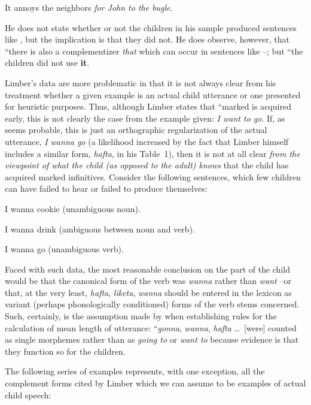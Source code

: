 \ea\label{ex:3:28}
 It annoys the neighbors \textit{for John to  the bugle}.
\z

\noindent He does not state whether or not the children in his sample produced sentences like , but the implication is that they did not. He does observe, however, that ``there is also a complementizer \textit{that} which can occur in sentences like --; but ``the children did not use \textbf{it}.

Limber's data are more problematic in that it is not always clear from his treatment whether a given example is an actual child utterance or one presented for heuristic purposes. Thus, although Limber states that ``marked  is acquired early, this is not clearly the case from the example given: \textit{I want to go}. If, as seems probable, this is just an orthographic regularization of the actual utterance, \textit{I wanna go} (a likelihood increased by the fact that Limber himself includes a similar form, \textit{hafta}, in his Table~1), then it is not at all clear \textit{from the viewpoint of what the child (as opposed to the adult) knows} that the child has acquired marked infinitives. Consider the following sentences, which few children can have failed to hear or failed to produce themselves:

\ea\label{ex:3:29}
 I wanna cookie (unambiguous noun).
\z

\ea\label{ex:3:30}
 I wanna drink (ambiguous between noun and verb).
\z

\ea\label{ex:3:31}
 I wanna go (unambiguous verb).
\z

\noindent Faced with such data, the most reasonable conclusion on the part of the child would be that the canonical form of the verb was \textit{wanna} rather than \textit{want} --or that, at the very least, \textit{hafta}, \textit{liketa}, \textit{wanna} should be entered in the lexicon as variant (perhaps phonologically conditioned) forms of the verb stems concerned. Such, certainly, is the assumption made by \citet[54]{Brown1973} when establishing rules for the calculation of mean length of utterance: ``\textit{gonna}, \textit{wanna}, \textit{hafta} \ldots~[were] counted as single morphemes rather than as \textit{going to} or \textit{want to} because evidence is that they function so for the children.

The following series of examples represents, with one exception, all the  complement forms cited by Limber which we can assume to be examples of actual child speech:

